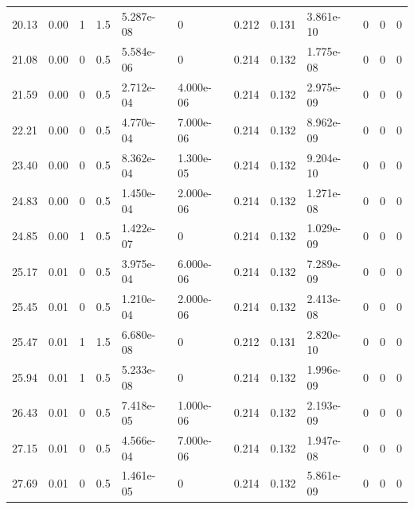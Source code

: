 \documentclass[preview]{standalone}
\begin{document}
{{\begin{tabular}{L{1.2cm}C{1.2cm} C{0.3cm}C{0.5cm} C{1.4cm}C{1.4cm} C{1.4cm}C{1.4cm} C{1.6cm}C{1.6cm} C{1.6cm}C{1.6cm}}
  20.13  &  0.00  & 1     & 1.5 &  5.287e-08  & 0  &  0.212&   0.131& 3.861e-10 & 0   &  0 & 0  \\ 
  21.08  &  0.00  & 0     & 0.5 &  5.584e-06  & 0  &  0.214&   0.132& 1.775e-08 & 0   &  0 & 0  \\ 
  21.59  &  0.00  & 0     & 0.5 &  2.712e-04  & 4.000e-06  &  0.214&   0.132& 2.975e-09 & 0   &  0 & 0  \\ 
  22.21  &  0.00  & 0     & 0.5 &  4.770e-04  & 7.000e-06  &  0.214&   0.132& 8.962e-09 & 0   &  0 & 0  \\ 
  23.40  &  0.00  & 0     & 0.5 &  8.362e-04  & 1.300e-05  &  0.214&   0.132& 9.204e-10 & 0   &  0 & 0  \\ 
  24.83  &  0.00  & 0     & 0.5 &  1.450e-04  & 2.000e-06  &  0.214&   0.132& 1.271e-08 & 0   &  0 & 0  \\ 
  24.85  &  0.00  & 1     & 0.5 &  1.422e-07  & 0  &  0.214&   0.132& 1.029e-09 & 0   &  0 & 0  \\ 
  25.17  &  0.01  & 0     & 0.5 &  3.975e-04  & 6.000e-06  &  0.214&   0.132& 7.289e-09 & 0   &  0 & 0  \\ 
  25.45  &  0.01  & 0     & 0.5 &  1.210e-04  & 2.000e-06  &  0.214&   0.132& 2.413e-08 & 0   &  0 & 0  \\ 
  25.47  &  0.01  & 1     & 1.5 &  6.680e-08  & 0  &  0.212&   0.131& 2.820e-10 & 0   &  0 & 0  \\ 
  25.94  &  0.01  & 1     & 0.5 &  5.233e-08  & 0  &  0.214&   0.132& 1.996e-09 & 0   &  0 & 0  \\ 
  26.43  &  0.01  & 0     & 0.5 &  7.418e-05  & 1.000e-06  &  0.214&   0.132& 2.193e-09 & 0   &  0 & 0  \\ 
  27.15  &  0.01  & 0     & 0.5 &  4.566e-04  & 7.000e-06  &  0.214&   0.132& 1.947e-08 & 0   &  0 & 0  \\ 
  27.69  &  0.01  & 0     & 0.5 &  1.461e-05  & 0  &  0.214&   0.132& 5.861e-09 & 0   &  0 & 0  \\ 
\hline 
\end{tabular} 

}}
\end{document}
